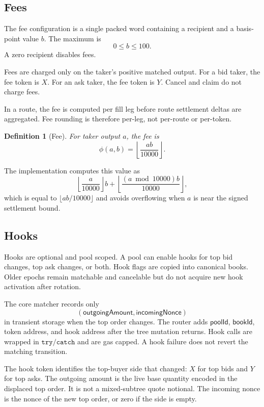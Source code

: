 \documentclass[11pt]{article}
\newtheorem{definition}{Definition}
\begin{document}
\subsection{Fees}

The fee configuration is a single packed word containing a recipient and
a basis-point value \(b\).  The maximum is
\[
  0 \le b \le 100.
\]
A zero recipient disables fees.

Fees are charged only on the taker's positive matched output.  For a bid
taker, the fee token is \(X\).  For an ask taker, the fee token is \(Y\).
Cancel and claim do not charge fees.

In a route, the fee is computed per fill leg before route settlement
deltas are aggregated.  Fee rounding is therefore per-leg, not per-route
or per-token.

\begin{definition}[Fee]
For taker output \(a\), the fee is
\[
  \phi(a,b)=\left\lfloor \frac{ab}{10000}\right\rfloor .
\]
\end{definition}

The implementation computes this value as
\[
  \left\lfloor\frac{a}{10000}\right\rfloor b
  + \left\lfloor \frac{(a\bmod 10000)b}{10000}\right\rfloor ,
\]
which is equal to \(\lfloor ab/10000\rfloor\) and avoids overflowing
when \(a\) is near the signed settlement bound.

\subsection{Hooks}

Hooks are optional and pool scoped.  A pool can enable hooks for top bid
changes, top ask changes, or both.  Hook flags are copied into canonical
books.  Older epochs remain matchable and cancelable but do not acquire
new hook activation after rotation.

The core matcher records only
\[
  (\mathsf{outgoingAmount},\mathsf{incomingNonce})
\]
in transient storage when the top order changes.  The router adds
\(\mathsf{poolId}\), \(\mathsf{bookId}\), token address, and hook
address after the tree mutation returns.  Hook calls are wrapped in
\(\mathtt{try/catch}\) and are gas capped.  A hook failure does not
revert the matching transition.

The hook token identifies the top-buyer side that changed: \(X\) for
top bids and \(Y\) for top asks.  The outgoing amount is the live base
quantity encoded in the displaced top order.  It is not a mixed-subtree
quote notional.  The incoming nonce is the nonce of the new top order,
or zero if the side is empty.
\end{document}
